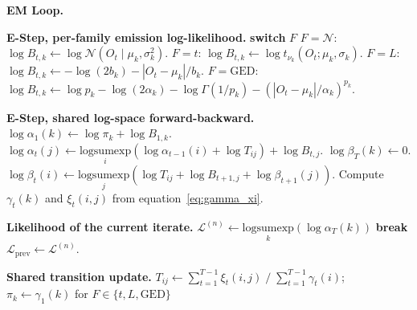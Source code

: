 \begin{breakablealgorithm}
\begin{algorithmic}[1]
\STATE \textbf{EM Loop.} 

    \STATE \textbf{E-Step, per-family emission log-likelihood.} \label{line:emit}
    \STATE \textbf{switch} $F$
    \STATE \quad $F = \mathcal{N}$: $\log B_{t,k} \leftarrow \log \mathcal{N}(O_t \mid \mu_k, \sigma_k^2)$.
    \STATE \quad $F = t$: $\log B_{t,k} \leftarrow \log t_{\nu_k}(O_t; \mu_k, \sigma_k)$.
    \STATE \quad $F = L$: $\log B_{t,k} \leftarrow -\log(2 b_k) - |O_t - \mu_k|/b_k$.
    \STATE \quad $F = \text{GED}$: $\log B_{t,k} \leftarrow \log p_k - \log(2 \alpha_k) - \log \Gamma(1/p_k) - (|O_t - \mu_k|/\alpha_k)^{p_k}$.

    \STATE \textbf{E-Step, shared log-space forward-backward.}
    \STATE $\log \alpha_1(k) \leftarrow \log \pi_k + \log B_{1,k}$.
        \STATE $\log \alpha_t(j) \leftarrow \underset{i}{\text{logsumexp}}\!\left(\log \alpha_{t-1}(i) + \log T_{ij}\right) + \log B_{t,j}$.
    \ENDFOR
    \STATE $\log \beta_T(k) \leftarrow 0$.
        \STATE $\log \beta_t(i) \leftarrow \underset{j}{\text{logsumexp}}\!\left(\log T_{ij} + \log B_{t+1,j} + \log \beta_{t+1}(j)\right)$.
    \ENDFOR
    \STATE Compute $\gamma_t(k)$ and $\xi_t(i,j)$ from equation~\eqref{eq:gamma_xi}.

    \STATE \textbf{Likelihood of the current iterate.} $\mathcal{L}^{(n)} \leftarrow \underset{k}{\text{logsumexp}}(\log \alpha_T(k))$ 
     \STATE \textbf{break}  \ENDIF
    \STATE $\mathcal{L}_{\text{prev}} \leftarrow \mathcal{L}^{(n)}$.

    \STATE \textbf{Shared transition update.} $T_{ij} \leftarrow \sum_{t=1}^{T-1} \xi_t(i,j) \;/\; \sum_{t=1}^{T-1} \gamma_t(i)$; \quad $\pi_k \leftarrow \gamma_1(k)$ for $F \in \{t, L, \text{GED}\}$ 


\end{algorithmic}
\end{breakablealgorithm}
